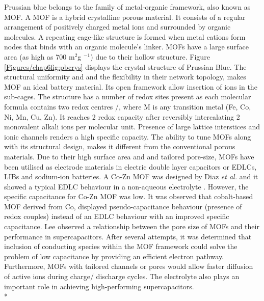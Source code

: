 Prussian blue belongs to the family of metal-organic framework, also known as MOF. A MOF is a hybrid crystalline porous material. It consists of a regular arrangement of positively charged metal ions and surrounded by organic molecules. A repeating cage-like structure is formed when metal cations form nodes that binds with an organic molecule's linker. MOFs have a large surface area (as high as 700 m$^{2}$g $^{-1}$) due to their hollow structure. Figure \ref{Figures/chap6fig:pbcrys} displays the crystal structure of Prussian Blue. The structural uniformity and and the flexibility in their network topology, makes MOF an ideal battery material. Its open framework allow insertion of ions in the sub-cages. The structure has a number of redox sites present as each molecular formula contains two redox centres /, where M is any transition metal (Fe, Co, Ni, Mn, Cu, Zn). It reaches 2 redox capacity after reversibly intercalating 2 monovalent alkali ions per molecular unit. Presence of large lattice interstices and ionic channels renders a high specific capacity. The ability to tune MOFs along with its structural design, makes it different from the conventional porous materials. Due to their high surface area and and tailored pore-size, MOFs have been utilised as electrode materials in electric double layer capacitors or EDLCs, LIBs and sodium-ion batteries. A Co-Zn MOF was designed by Diaz \textit{et al.} and it showed a typical EDLC behaviour in a non-aqueous electrolyte \cite{diaz_co8-mof-5_2012}. However, the specific capacitance for Co-Zn MOF was low. It was observed that cobalt-based MOF derived from Co, displayed pseudo-capacitance behaviour (presence of redox couples) instead of an EDLC behaviour with an improved specific capacitance. Lee  observed a relationship between the pore size of MOFs and their performance in supercapacitors. After several attempts, it was determined that inclusion of conducting species within the MOF framework could solve the problem of low capacitance by providing an efficient electron pathway. Furthermore, MOFs with tailored channels or pores would allow faster diffusion of active ions during charge/ discharge cycles. The electrolyte also plays an important role in achieving high-performing supercapacitors. \\*
